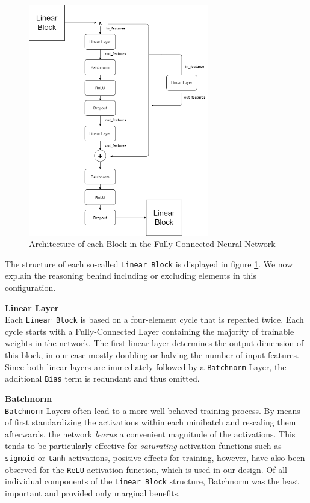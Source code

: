 \documentclass[12pt, letterpaper]{article}
\begin{document}
\begin{figure}[t]
    \centering
    \includegraphics[width=0.7\textwidth]{mlp_architecture.png}
    \caption{Architecture of each Block in the Fully Connected Neural Network}
    \label{fig:linear-block}
\end{figure}

The structure of each so-called \texttt{Linear Block} is displayed in figure \ref{fig:linear-block}.
We now explain the reasoning behind including or excluding elements in this configuration.

\textbf{Linear Layer} \\
Each \texttt{Linear Block} is based on a four-element cycle that is repeated twice.
Each cycle starts with a Fully-Connected Layer containing the majority of trainable weights in the network.
The first linear layer determines the output dimension of this block, in our case mostly doubling or halving the number of input features.
Since both linear layers are immediately followed by a \texttt{Batchnorm} Layer, the additional \texttt{Bias} term is redundant and thus omitted.

\textbf{Batchnorm} \\
\texttt{Batchnorm} Layers \cite{ioffe2015} often lead to a more well-behaved training process.
By means of first standardizing the activations within each minibatch and rescaling them afterwards, the network \emph{learns} a convenient magnitude of the activations.
This tends to be particularly effective for \emph{saturating} activation functions such as \texttt{sigmoid} or \texttt{tanh} activations, positive effects for training, however, have also been observed for the \texttt{ReLU} activation function, which is used in our design.
Of all individual components of the \texttt{Linear Block} structure, Batchnorm was the least important and provided only marginal benefits.
\end{document}
